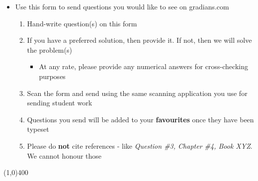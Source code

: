 \documentclass[12pt,a4paper,justified]{tufte-exam}
\begin{document}
  \begin{fullwidth}
    \begin{itemize}
      \item Use this form to send questions you would like to see on gradians.com
      \begin{enumerate}
        \item Hand-write question(s) on this form 
        \item If you have a preferred solution, then provide it. If not, then we will solve the problem(s)
        \begin{itemize}
          \item At any rate, please provide any numerical answers for cross-checking purposes
        \end{itemize}
        \item Scan the form and send using the same scanning application you use for sending student work
        \item Questions you send will be added to your \textbf{favourites} once they have been typeset
        \item Please do \textbf{not} cite references - like \textit{Question \#3, Chapter \#4, Book XYZ}.
              We cannot honour those
      \end{enumerate}
    \end{itemize}
    \line(1,0){400}
  \end{fullwidth}
\end{document}
